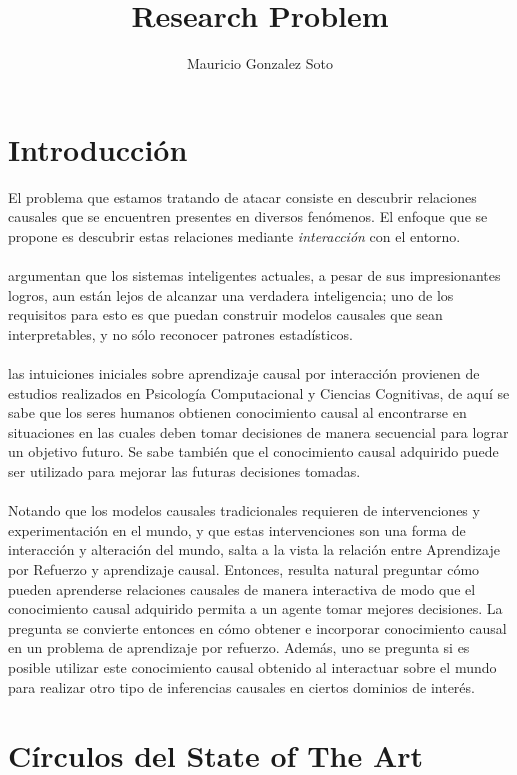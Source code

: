 \documentclass[11pt]{article}
\title{Research Problem}
\author{Mauricio Gonzalez Soto}
\theoremstyle{plain}
\begin{document}
\maketitle
\section{Introducción}
El problema que estamos tratando de atacar consiste en descubrir relaciones causales que se encuentren presentes en diversos fenómenos. El enfoque que se propone es descubrir estas relaciones mediante \textit{interacción} con el entorno.\\
\\
\cite{lake2017building} argumentan que los sistemas inteligentes actuales, a pesar de sus impresionantes logros, aun están lejos de alcanzar una verdadera inteligencia; uno de los requisitos para esto es que puedan construir modelos causales que sean interpretables, y no sólo reconocer patrones estadísticos.\\
\\
 las intuiciones iniciales sobre aprendizaje causal por interacción provienen de estudios realizados en Psicología Computacional y Ciencias Cognitivas, de aquí se sabe que los seres humanos obtienen conocimiento causal al encontrarse en situaciones en las cuales deben tomar decisiones de manera secuencial para lograr un objetivo futuro. Se sabe también que el conocimiento causal adquirido puede ser utilizado para mejorar las futuras decisiones tomadas.\\
\\
Notando que los modelos causales tradicionales requieren de intervenciones y experimentación en el mundo, y que estas intervenciones son una forma de interacción y alteración del mundo, salta a la vista la relación entre Aprendizaje por Refuerzo y aprendizaje causal. Entonces, resulta natural preguntar cómo pueden aprenderse relaciones causales de manera interactiva de modo que el conocimiento causal adquirido permita a un agente tomar mejores decisiones. La pregunta se convierte entonces en cómo obtener e incorporar conocimiento causal en un problema de aprendizaje por refuerzo. Además, uno se pregunta si es posible utilizar este conocimiento causal obtenido al interactuar sobre el mundo para realizar otro tipo de inferencias causales en ciertos dominios de interés.

\section{Círculos del State of The Art}
\end{document}
